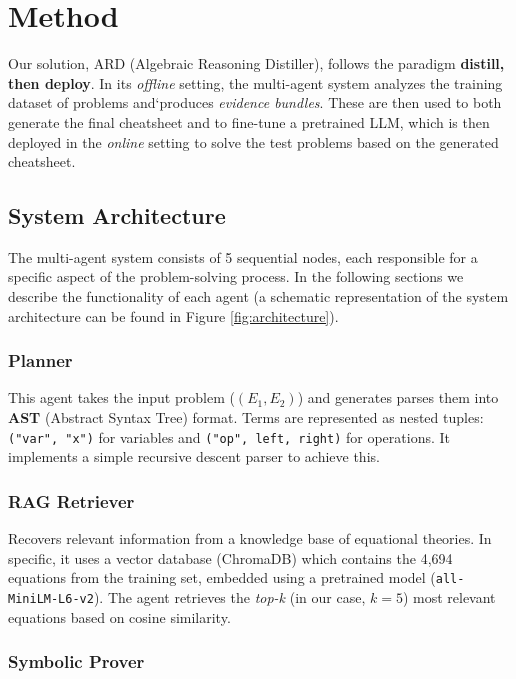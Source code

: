 \documentclass{article}
\begin{document}
\section{Method}

Our solution, ARD (Algebraic Reasoning Distiller), follows the paradigm \textbf{distill, then deploy}. In its \textit{offline} setting, the multi-agent system analyzes the training dataset of problems and`produces \textit{evidence bundles}. These are then used to both generate the final cheatsheet and to fine-tune a pretrained LLM, which is then deployed in the \textit{online} setting to solve the test problems based on the generated cheatsheet.

\subsection{System Architecture}

The multi-agent system consists of 5 sequential nodes, each responsible for a specific aspect of the problem-solving process. In the following sections we describe the functionality of each agent (a schematic representation of the system architecture can be found in Figure \ref{fig:architecture}).


\subsubsection{Planner}

This agent takes the input problem (\( (E_1, E_2) \)) and generates parses them into \textbf{AST} (Abstract Syntax Tree) format. Terms are represented as nested tuples: \texttt{("var", "x")} for variables and \texttt{("op", left, right)} for operations. It implements a simple recursive descent parser to achieve this.


\subsubsection{RAG Retriever}
Recovers relevant information from a knowledge base of equational theories. In specific, it uses a vector database (ChromaDB) which contains the 4,694 equations from the training set, embedded using a pretrained model (\texttt{all-MiniLM-L6-v2}). The agent retrieves the \textit{top-k} (in our case, $k=5$) most relevant equations based on cosine similarity.

\subsubsection{Symbolic Prover}
\end{document}

